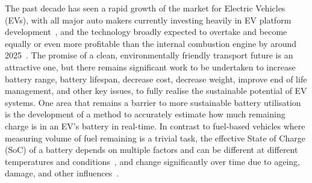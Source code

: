%
%
The past decade has seen a rapid growth of the market for Electric Vehicles (EVs), with all major auto makers currently investing heavily in EV platform development~\cite{iea_global_2023}, and the technology broadly expected to overtake and become equally or even more profitable than the internal combustion engine by around 2025~\cite{baik_making_2019}.
The promise of a clean, environmentally friendly transport future is an attractive one, but there remains significant work to be undertaken to increase battery range, battery lifespan, decrease cost, decrease weight, improve end of life management, and other key issues, to fully realise the sustainable potential of EV systems.
One area that remains a barrier to more sustainable battery utilisation is the development of a method to accurately estimate how much remaining charge is in an EV's battery in real-time.
In contrast to fuel-based vehicles where measuring volume of fuel remaining is a trivial task, the effective State of Charge (SoC) of a battery depends on multiple factors and can be different at different temperatures and conditions~\cite{xing_state_2014}, and change significantly over time due to ageing, damage, and other influences~\cite{johansson_neural_2018}.

